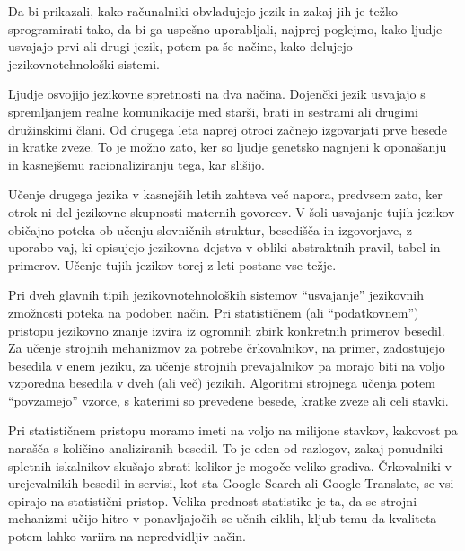 \begin{multicols}{2}
Da bi prikazali, kako računalniki obvladujejo jezik in zakaj jih je težko sprogramirati tako, da bi ga uspešno uporab\-ljali, naj\-prej poglejmo, kako ljudje usvajajo prvi ali drugi jezik, potem pa še načine, kako delujejo jezikovnotehnološki sistemi.

Ljudje osvojijo jezikovne spretnosti na dva načina. Dojenčki jezik usvajajo s spremljanjem realne komunikacije med starši, brati in sestrami ali drugimi družinskimi člani. Od drugega leta naprej otroci začnejo izgovarjati prve besede in kratke zveze. To je možno zato, ker so ljudje genetsko nagnjeni k oponašanju in kasnejšemu racionaliziranju tega, kar slišijo.

Učenje drugega jezika v kasnejših letih zah\-teva več napora, predvsem zato, ker otrok ni del jezikovne skupnosti maternih go\-vorcev. V šoli usvajanje tujih jezikov običajno poteka ob učenju slovničnih struktur, besedišča in izgo\-vorjave, z uporabo vaj, ki opisujejo jezikovna dejstva v obliki abstraktnih pravil, tabel in primerov. Učenje tujih jezikov torej z leti postane vse težje. 


Pri dveh glavnih tipih jezikovnotehnoloških sistemov “usvajanje” jezikovnih zmožnosti poteka na podoben način. Pri statističnem (ali “podatkovnem”) pristopu jezikovno znanje izvira iz ogromnih zbirk konkretnih primerov besedil. Za učenje stroj\-nih mehanizmov za potrebe črkovalnikov, na primer, zadostujejo besedila v enem jeziku, za učenje stroj\-nih prevajalnikov pa morajo biti na voljo vzporedna besedila v dveh (ali več) jezikih. Algoritmi stroj\-nega učenja potem “povzamejo” vzorce, s katerimi so prevedene besede, kratke zveze ali celi stavki.

Pri statističnem pristopu moramo imeti na voljo na mili\-jone stavkov,  kakovost pa narašča s količino analiziranih besedil. To je eden od razlogov, zakaj ponudniki spletnih iskalnikov skušajo zbrati kolikor je mogoče veliko gradiva. Črkovalniki v urejevalnikih besedil in servisi, kot sta Google Search ali Google Translate, se vsi opirajo na statistični pristop. Velika prednost statistike je ta, da se stroj\-ni mehanizmi učijo hitro v ponav\-ljajočih se učnih ciklih, kljub temu da kvaliteta potem lahko variira na nepredvidljiv način. %


\end{multicols}
